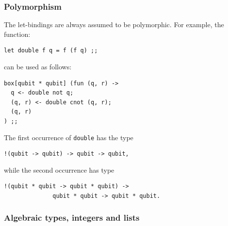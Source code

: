 \subsubsection{Polymorphism}

The let-bindings are always assumed to be polymorphic. For example, the 
function:
\begin{verbatim}
let double f q = f (f q) ;;
\end{verbatim}
can be used as follows:
\begin{verbatim}
box[qubit * qubit] (fun (q, r) ->
  q <- double not q;
  (q, r) <- double cnot (q, r);
  (q, r)
) ;;
\end{verbatim}
The first occurrence of \verb#double# has the type 
\begin{verbatim}
!(qubit -> qubit) -> qubit -> qubit,
\end{verbatim}
while the second occurrence has type 
\begin{verbatim}
!(qubit * qubit -> qubit * qubit) -> 
              qubit * qubit -> qubit * qubit.
\end{verbatim}

\subsubsection{Algebraic types, integers and lists}

